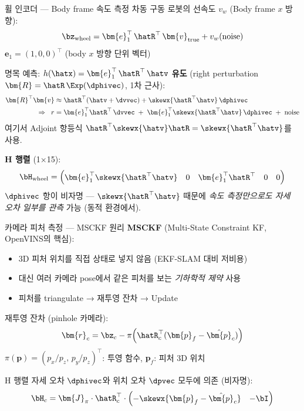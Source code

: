 \begin{frame}{휠 인코더 — Body frame 속도 측정}
  차동 구동 로봇의 선속도 $v_w$ (Body frame $x$ 방향):
  \[
    \bz_\text{wheel} = \bm{e}_1^\top\,\hatR^\top\,\bm{v}_\text{true} + v_w\text{(noise)}
  \]
  $\bm{e}_1 = (1,0,0)^\top$ (body $x$ 방향 단위 벡터)

  명목 예측: $h(\hatx) = \bm{e}_1^\top\,\hatR^\top\,\hatv$
  \vspace{0.3em}
  \pause
  \textbf{유도} (right perturbation $\bm{R} = \hatR\,\Exp(\dphivec)$, 1차 근사):
  \begin{align*}
    \bm{R}^\top \bm{v} &\approx \hatR^\top(\hatv + \dvvec) + \skewx{\hatR^\top \hatv}\,\dphivec\\
    \Rightarrow\;\; r &= \bm{e}_1^\top\hatR^\top\,\dvvec \;+\; \bm{e}_1^\top\skewx{\hatR^\top\hatv}\,\dphivec \;+\; \text{noise}
  \end{align*}
  여기서 Adjoint 항등식 $\hatR^\top\skewx{\hatv}\hatR = \skewx{\hatR^\top\hatv}$를 사용.

  \textbf{H 행렬} (1×15):
  \[
    \bH_\text{wheel} = \begin{pmatrix}
      \bm{e}_1^\top\skewx{\hatR^\top\hatv} &
      0 &
      \bm{e}_1^\top\hatR^\top &
      0 & 0
    \end{pmatrix}
  \]
  \pause
  \footnotesize
  $\dphivec$ 항이 비자명 — $\skewx{\hatR^\top\hatv}$ 때문에 \emph{속도 측정만으로도 자세 오차 일부를 관측} 가능 (동적 환경에서).
\end{frame}

\begin{frame}[shrink=5]{카메라 피처 측정 — MSCKF 원리}
  \textbf{MSCKF} (Multi-State Constraint KF, OpenVINS의 핵심):
  \begin{itemize}
    \item 3D 피처 위치를 직접 상태로 넣지 않음 (EKF-SLAM 대비 저비용)
    \item 대신 여러 카메라 pose에서 같은 피처를 보는 \emph{기하학적 제약} 사용
    \item 피처를 triangulate → 재투영 잔차 → Update
  \end{itemize}
  \pause
  재투영 잔차 (pinhole 카메라):
  \[
    \bm{r}_c = \bz_c - \pi\!\left(\hatR_c^\top(\bm{p}_f - \hat{\bm{p}}_c)\right)
  \]
  $\pi(\bm{p}) = (p_x/p_z,\, p_y/p_z)^\top$: 투영 함수, $\bm{p}_f$: 피처 3D 위치

  \pause
  \begin{block}{H 행렬}
    자세 오차 $\dphivec$와 위치 오차 $\dpvec$ 모두에 의존 (비자명):
    \[
      \bH_c = \bm{J}_\pi \cdot \hatR_c^\top \cdot
              \begin{pmatrix} -\skewx{\bm{p}_f - \hat{\bm{p}}_c} & -\bI \end{pmatrix}
    \]
  \end{block}
\end{frame}


